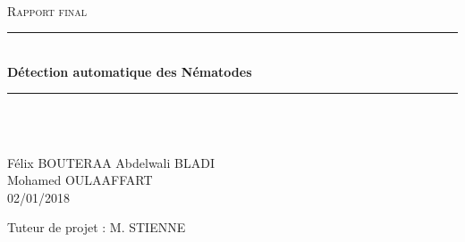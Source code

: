 \documentclass[12pt,a4paper]{article}
\newcommand{\HRule}{\rule{\linewidth}{0.5mm}}
\begin{document}
\begin{titlepage}
  \begin{sffamily}
  \begin{center}
\begin{figure}

\end{figure}

    \\[2.5cm]

    \textsc{\Large Rapport final}\\[1.5cm]

    \HRule \\[0.4cm]
    { \huge \bfseries Détection automatique des Nématodes \\[0.4cm] }
 \HRule \\[1.5cm]
 
 \\[8cm]


        \begin{flushleft}
	Félix BOUTERAA 
	Abdelwali BLADI \\
	Mohamed OULAAFFART \\
	02/01/2018 \\
	\end{flushleft}  
    
    \begin{flushright}
Tuteur de projet : M. STIENNE
\end{flushright}  

  \end{center}
  \end{sffamily}
\end{titlepage}

\newpage

\tableofcontents

\newpage

\listoffigures

\newpage
\end{document}
